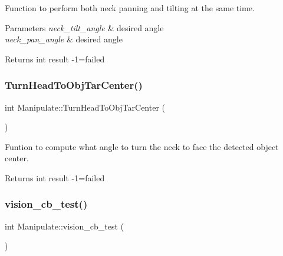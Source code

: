 Function to perform both neck panning and tilting at the same time. 


\begin{DoxyParams}{Parameters}
{\em neck\+\_\+tilt\+\_\+angle} & desired angle \\
\hline
{\em neck\+\_\+pan\+\_\+angle} & desired angle \\
\hline
\end{DoxyParams}
\begin{DoxyReturn}{Returns}
int result -\/1=failed 
\end{DoxyReturn}
\mbox{\label{structManipulate_aad305b9b5bc679d1c13754bdd8c73127}} 
\subsubsection{\texorpdfstring{Turn\+Head\+To\+Obj\+Tar\+Center()}{TurnHeadToObjTarCenter()}}
{\footnotesize\ttfamily int Manipulate\+::\+Turn\+Head\+To\+Obj\+Tar\+Center (\begin{DoxyParamCaption}{ }\end{DoxyParamCaption})\hspace{0.3cm}{\ttfamily [private]}}



Funtion to compute what angle to turn the neck to face the detected object center. 

\begin{DoxyReturn}{Returns}
int result -\/1=failed 
\end{DoxyReturn}
\mbox{\label{structManipulate_a27f72bbd1c909b5fc1c06e320467a947}} 
\subsubsection{\texorpdfstring{vision\+\_\+cb\+\_\+test()}{vision\_cb\_test()}}
{\footnotesize\ttfamily int Manipulate\+::vision\+\_\+cb\+\_\+test (\begin{DoxyParamCaption}{ }\end{DoxyParamCaption})\hspace{0.3cm}{\ttfamily [private]}}



